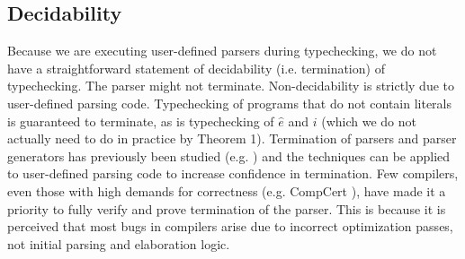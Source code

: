 \subsection{Decidability}
Because we are executing user-defined parsers during typechecking, we do not have a straightforward statement of decidability (i.e. termination) of typechecking. The parser might not terminate. Non-decidability is strictly due to user-defined parsing code. Typechecking of programs that do not contain literals is guaranteed to terminate, as is typechecking of $\hat{e}$ and $i$ (which we do not actually need to do in practice by Theorem 1). Termination of parsers and parser generators has previously been studied (e.g. \cite{DBLP:conf/sle/KrishnanW12}) and the techniques can be applied to user-defined parsing code to increase confidence in termination. Few compilers, even those with high demands for correctness (e.g. CompCert \cite{Leroy-Compcert-CACM}), have made it a priority to fully verify and prove termination of the parser. This is because it is perceived that most bugs in compilers arise due to incorrect optimization passes, not initial parsing and elaboration logic.
